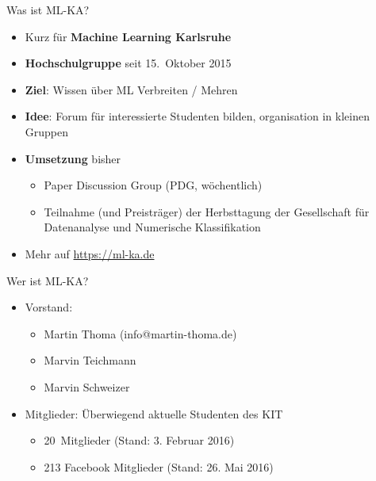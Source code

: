 \documentclass{beamer}
\begin{document}
\begin{frame}{Was ist ML-KA?}
    \begin{itemize}
        \item Kurz für \textbf{Machine Learning Karlsruhe}
        \item \textbf{Hochschulgruppe} seit 15.~Oktober 2015
        \item \textbf{Ziel}: Wissen über ML Verbreiten / Mehren
        \item \textbf{Idee}: Forum für interessierte Studenten bilden,
              organisation in kleinen Gruppen
        \item \textbf{Umsetzung} bisher
        \begin{itemize}
            \item Paper Discussion Group (PDG, wöchentlich)
            \item Teilnahme (und Preisträger) der Herbsttagung der Gesellschaft
                  für Datenanalyse und Numerische Klassifikation
        \end{itemize}
        \item Mehr auf \href{https://ml-ka.de/}{https://ml-ka.de}
    \end{itemize}
\end{frame}

\begin{frame}{Wer ist ML-KA?}
    \begin{itemize}
        \item Vorstand:
        \begin{itemize}
            \item Martin Thoma (info@martin-thoma.de)
            \item Marvin Teichmann
            \item Marvin Schweizer
        \end{itemize}
        \item Mitglieder: Überwiegend aktuelle Studenten des KIT
        \begin{itemize}
            \item 20~Mitglieder (Stand: 3. Februar 2016)
            \item 213 Facebook Mitglieder (Stand: 26. Mai 2016)
        \end{itemize}
    \end{itemize}
\end{frame}
\end{document}
